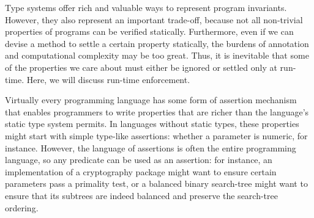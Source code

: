 \secdown

Type systems offer rich and valuable ways to represent program invariants.
However, they also represent an important trade-off, because not all non-trivial
properties of programs can be verified statically. Furthermore, even if we can
devise a method to settle a certain property statically, the burdens of
annotation and computational complexity may be too great. Thus, it is inevitable
that some of the properties we care about must either be ignored or settled only
at run-time. Here, we will discuss run-time enforcement.

Virtually every programming language has some form of assertion mechanism that
enables programmers to write properties that are richer than the language’s
static type system permits. In languages without static types, these properties
might start with simple type-like assertions: whether a parameter is numeric,
for instance. However, the language of assertions is often the entire
programming language, so any predicate can be used as an assertion: for
instance, an implementation of a cryptography package might want to ensure
certain parameters pass a primality test, or a balanced binary search-tree might
want to ensure that its subtrees are indeed balanced and preserve the
search-tree ordering.










\secup

